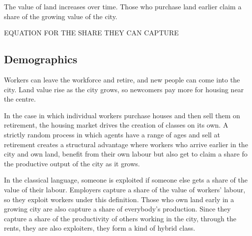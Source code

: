The value of land increases over time. Those who purchase land earlier claim a share of the growing value of the city. %
 

EQUATION FOR THE SHARE THEY CAN CAPTURE


\subsection{Demographics}

Workers can leave the workforce and retire, and new people can come into the city. Land value rise as the city grows, so newcomers pay more for housing near the centre.

In the case in which individual workers purchase houses and then sell them on retirement, the housing market drives the creation of classes on its own. A strictly random process in which agents have a range of ages and sell at retirement creates a structural advantage where workers who arrive earlier in the city and own land, benefit from their own labour but also get to claim a share fo the productive output of the city as it grows. %

In the classical language, someone is exploited if someone else gets a share of the value of their labour. %
 Employers capture a share of the value of workers' labour, so they exploit workers under this definition.
Those who own land early in a growing city are also capture a share of everybody's production. Since they capture a share of the productivity of others working in the city, through the rents, they are also exploiters, they form a kind of hybrid class. %

